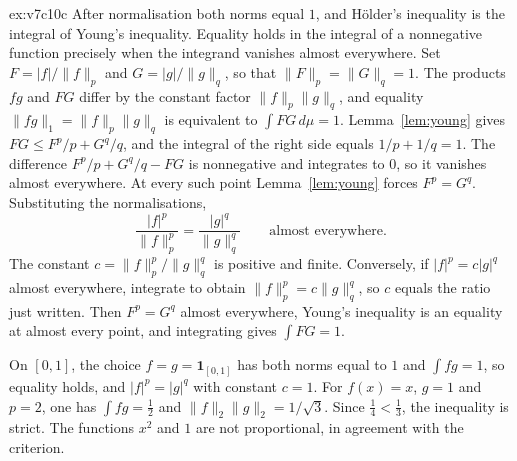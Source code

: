 \begin{solution}{ex:v7c10c}
\idea After normalisation both norms equal $1$, and Hölder's inequality is the integral of Young's inequality. Equality holds in the integral of a nonnegative function precisely when the integrand vanishes almost everywhere.
\writeup Set $F=|f|/\|f\|_p$ and $G=|g|/\|g\|_q$, so that $\|F\|_p=\|G\|_q=1$. The products $fg$ and $FG$ differ by the constant factor $\|f\|_p\|g\|_q$, and equality $\|fg\|_1=\|f\|_p\|g\|_q$ is equivalent to $\int FG\,d\mu=1$. Lemma~\ref{lem:young} gives $FG\le F^p/p+G^q/q$, and the integral of the right side equals $1/p+1/q=1$. The difference $F^p/p+G^q/q-FG$ is nonnegative and integrates to $0$, so it vanishes almost everywhere. At every such point Lemma~\ref{lem:young} forces $F^p=G^q$. Substituting the normalisations,
\[\frac{|f|^p}{\|f\|_p^p}=\frac{|g|^q}{\|g\|_q^q}\qquad\text{almost everywhere.}\]
The constant $c=\|f\|_p^p/\|g\|_q^q$ is positive and finite. Conversely, if $|f|^p=c|g|^q$ almost everywhere, integrate to obtain $\|f\|_p^p=c\|g\|_q^q$, so $c$ equals the ratio just written. Then $F^p=G^q$ almost everywhere, Young's inequality is an equality at almost every point, and integrating gives $\int FG=1$.

On $[0,1]$, the choice $f=g=\mathbf 1_{[0,1]}$ has both norms equal to $1$ and $\int fg=1$, so equality holds, and $|f|^p=|g|^q$ with constant $c=1$. For $f(x)=x$, $g=1$ and $p=2$, one has $\int fg=\frac12$ and $\|f\|_2\|g\|_2=1/\sqrt3$. Since $\frac14<\frac13$, the inequality is strict. The functions $x^2$ and $1$ are not proportional, in agreement with the criterion.
\end{solution}

